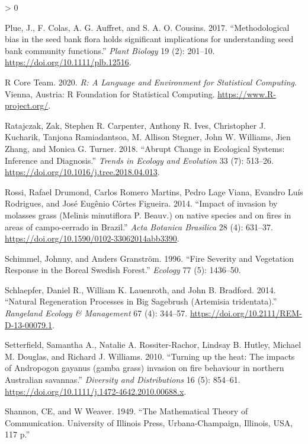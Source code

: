 \documentclass[
  12pt,
]{article}
\newlength{\cslhangindent}
\newenvironment{CSLReferences}[2] %
 {%
  \setlength{\parindent}{0pt}
  \ifodd #1 \everypar{\setlength{\hangindent}{\cslhangindent}}\ignorespaces\fi
  \ifnum #2 > 0
  \setlength{\parskip}{#2\baselineskip}
  \fi
 }%
 {}
\begin{document}
\begin{CSLReferences}{1}{0}
\leavevmode\hypertarget{ref-Plue2017}{}%
Plue, J., F. Colas, A. G. Auffret, and S. A. O. Cousins. 2017.
{``{Methodological bias in the seed bank flora holds significant
implications for understanding seed bank community functions}.''}
\emph{Plant Biology} 19 (2): 201--10.
\url{https://doi.org/10.1111/plb.12516}.

\leavevmode\hypertarget{ref-R}{}%
R Core Team. 2020. \emph{R: A Language and Environment for Statistical
Computing}. Vienna, Austria: R Foundation for Statistical Computing.
\url{https://www.R-project.org/}.

\leavevmode\hypertarget{ref-Ratajczak2018}{}%
Ratajczak, Zak, Stephen R. Carpenter, Anthony R. Ives, Christopher J.
Kucharik, Tanjona Ramiadantsoa, M. Allison Stegner, John W. Williams,
Jien Zhang, and Monica G. Turner. 2018. {``{Abrupt Change in Ecological
Systems: Inference and Diagnosis}.''} \emph{Trends in Ecology and
Evolution} 33 (7): 513--26.
\url{https://doi.org/10.1016/j.tree.2018.04.013}.

\leavevmode\hypertarget{ref-Rossi2014}{}%
Rossi, Rafael Drumond, Carlos Romero Martins, Pedro Lage Viana, Evandro
Luís Rodrigues, and José Eugênio Côrtes Figueira. 2014. {``{Impact of
invasion by molasses grass (Melinis minutiflora P. Beauv.) on native
species and on fires in areas of campo-cerrado in Brazil}.''} \emph{Acta
Botanica Brasilica} 28 (4): 631--37.
\url{https://doi.org/10.1590/0102-33062014abb3390}.

\leavevmode\hypertarget{ref-Schimmel1996}{}%
Schimmel, Johnny, and Anders Granström. 1996. {``{Fire Severity and
Vegetation Response in the Boreal Swedish Forest}.''} \emph{Ecology} 77
(5): 1436--50.

\leavevmode\hypertarget{ref-Schlaepfer2014}{}%
Schlaepfer, Daniel R., William K. Lauenroth, and John B. Bradford. 2014.
{``{Natural Regeneration Processes in Big Sagebrush (Artemisia
tridentata)}.''} \emph{Rangeland Ecology \& Management} 67 (4): 344--57.
\url{https://doi.org/10.2111/REM-D-13-00079.1}.

\leavevmode\hypertarget{ref-Setterfield2010}{}%
Setterfield, Samantha A., Natalie A. Rossiter-Rachor, Lindsay B. Hutley,
Michael M. Douglas, and Richard J. Williams. 2010. {``{Turning up the
heat: The impacts of Andropogon gayanus (gamba grass) invasion on fire
behaviour in northern Australian savannas}.''} \emph{Diversity and
Distributions} 16 (5): 854--61.
\url{https://doi.org/10.1111/j.1472-4642.2010.00688.x}.

\leavevmode\hypertarget{ref-Shannon1949}{}%
Shannon, CE, and W Weaver. 1949. {``The Mathematical Theory of
Communication. University of Illinois Press, Urbana-Champaign, Illinois,
USA, 117 p.''}


\end{CSLReferences}
\end{document}
